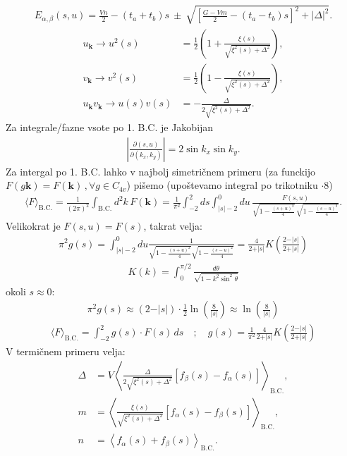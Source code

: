 \documentclass[a4paper,10pt]{article}
\renewcommand{\vec}[1]{\mathbf{#1}}
\begin{document}
\begin{align}
E_{\alpha,\beta}(s,u)=
\frac{Vn}{2}-(t_a+t_b)s
\ \pm\
\sqrt{
\left[\frac{G-Vm}{2}-(t_a-t_b)s\right]^2+|\Delta|^2
}.
\end{align}
\begin{align}
u_{\vec k} \to u^2(s)
&={\frac12\left(1+\frac{\xi(s)}{\sqrt{\xi^2(s)+\Delta^2}}\right)},\\
v_{\vec k} \to v^2(s)
&={\frac12\left(1-\frac{\xi(s)}{\sqrt{\xi^2(s)+\Delta^2}}\right)},\\
u_{\vec k}v_{\vec k} \to u(s)v(s)
&=-\frac{\Delta}{2\sqrt{\xi^2(s)+\Delta^2}}.
\end{align}
Za integrale/fazne vsote po 1. B.C. je Jakobijan
\begin{align}
\left|\frac{\partial(s,u)}{\partial(k_x,k_y)}\right|
=2\sin k_x\sin k_y.
\end{align}
Za intergal po 1. B.C. lahko v najbolj simetričnem primeru (za funckijo $F(g\vec{k}) = F(\vec{k})\,,\forall g\in C_{4v}$) pišemo (upoštevamo integral po trikotniku $\cdot 8$)
\begin{align}
\langle F\rangle_{\mathrm{B.C.}}
=\frac{1}{(2\pi)^2}\int_{\mathrm{B.C.}}d^2k\,F(\vec k) =\frac1{\pi^2}
\int_{-2}^{2}ds\int_{|s|-2}^{0}du\,
\frac{F(s,u)}
{\sqrt{1-\frac{(s+u)^2}{4}}\,
 \sqrt{1-\frac{(s-u)^2}{4}}}.
\end{align}
Velikokrat je $F(s, u) = F(s)$, takrat velja: 
\begin{align}
  \pi^2  g(s)= \int_{\vert{}s\vert{}-2}^{0} du \frac{1}{\sqrt{1 - \frac{(s+u)^2}{4}} \sqrt{1 - \frac{(s-u)^2}{4}}} = \frac{4}{2+\vert{}s\vert{}} K\left( \frac{2-\vert{}s\vert{}}{2+\vert{}s\vert{}} \right) 
\end{align}
\begin{align}
  K(k) = \int_{0}^{\pi/2} \frac{d\theta}{\sqrt{1 - k^2 \sin^2\theta}}
\end{align}
okoli $s \approx 0:$
\begin{align}
  \pi^2 g(s) \approx (2-\vert{}s\vert{}) \cdot \frac{1}{2} \ln\left(\frac{8}{\vert{}s\vert{}}\right) \approx \ln\left(\frac{8}{\vert{}s\vert{}}\right)
\end{align}
\begin{align}
  \langle F \rangle_{\text{B.C.}} = \int_{-2}^{2} g(s) \cdot F(s) \, ds \quad ; \quad g(s) = \frac{1}{\pi^2} \frac{4}{2+\vert{}s\vert{}} K\left( \frac{2-\vert{}s\vert{}}{2+\vert{}s\vert{}} \right)
\end{align}
V termičnem primeru velja: 
\begin{align}
\Delta
&=V\left\langle
\frac{\Delta}{2\sqrt{\xi^2(s)+\Delta^2}}[f_\beta(s)-f_\alpha(s)]
\right\rangle_{\mathrm{B.C.}},\\
m
&=\left\langle
\frac{\xi(s)}{\sqrt{\xi^2(s)+\Delta^2}}[f_\alpha(s)-f_\beta(s)]
\right\rangle_{\mathrm{B.C.}},\\
n
&=\left\langle f_\alpha(s)+f_\beta(s)\right\rangle_{\mathrm{B.C.}}.
\end{align}
\end{document}
